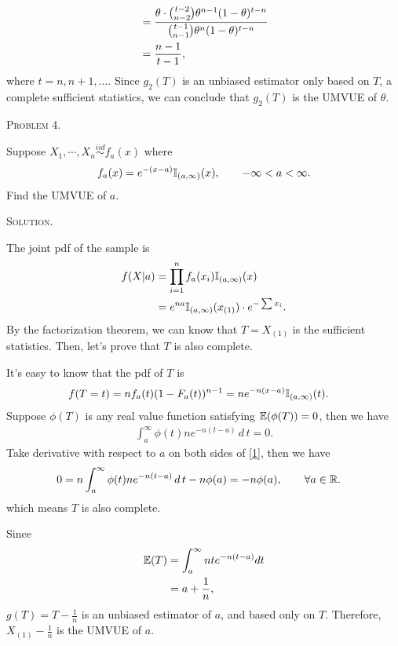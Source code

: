 \documentclass{article}
\begin{document}
\begin{CJK}{UTF8}{gbsn}
\begin{itemize}
\begin{align}
                         & = \frac{\theta \cdot \binom{t-2}{n-2}\theta^{n-1}(1-\theta)^{t-n}}{\binom{t-1}{n-1}\theta^n(1-\theta)^{t-n}} \notag \\
                         & = \frac{n-1}{t-1},\notag
              \end{align}
              where $t = n, n+1, \ldots$.
              Since $g_2(T)$ is an unbiased estimator only based on $T$, a complete sufficient statistics, we can conclude that
              $g_2(T)$ is the UMVUE of $\theta$.
    \end{itemize}





    \begin{shaded}
        \noindent\textsc{Problem 4.}\par
        Suppose $X_1, \cdots, X_n \mathop{\sim}\limits^{iid} f_a(x)$ where
        \begin{align}
            f_a(x) = e^{-(x-a)}{\mathbb I}_{(a, \infty)}(x), \qquad -\infty < a < \infty.
        \end{align}
        Find the UMVUE of $a$.
    \end{shaded}
    \noindent\textsc{Solution.}\par
    The joint pdf of the sample is
    \begin{align}
        f(X|a) & = \prod_{i=1}^n f_a(x_i) {\mathbb I}_{(a, \infty)}(x) \notag            \\
               & = e^{na} {\mathbb I}_{(a, \infty)}(x_{(1)}) \cdot e^{-\sum x_i}. \notag
    \end{align}
    By the factorization theorem, we can know that $T=X_{(1)}$ is the sufficient statistics.
    Then, let's prove that $T$ is also complete.

    It's easy to know that the pdf of $T$ is
    \begin{align}
        f(T=t) & = n f_a(t) (1-F_a(t))^{n-1} = n e^{-n(x-a)} {\mathbb I}_{(a, \infty)}(t).\notag
    \end{align}
    Suppose $\phi(T)$ is any real value function satisfying ${\mathbb E}(\phi(T))=0$, then we have
    \begin{align}
        \int_a^{\infty} \phi(t) n e^{-n(t-a)}\, d \, t = 0.\label{1}
    \end{align}
    Take derivative with respect to $a$ on both sides of \eqref{1}, then we have
    \begin{align}
        0 & = n \int_{a}^{\infty} \phi(t) ne^{-n(t-a)}\, d\,t - n\phi(a) = -n\phi(a), \qquad \forall a \in {\mathbb R}.\notag
    \end{align}
    which means $T$ is also complete.

    Since
    \begin{align}
        {\mathbb E}(T) & = \int_a^{\infty} nte^{-n(t-a)} dt \notag \\
               & = a + \frac{1}{n},\notag
    \end{align}
    $g(T) = T - \frac{1}{n}$ is an unbiased estimator of $a$, and based only on $T$.
    Therefore, $X_{(1)}-\frac{1}{n}$ is the UMVUE of $a$.


\end{CJK}
\end{document}
